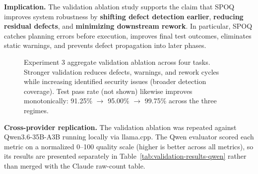 \textbf{Implication.}
The validation ablation study supports the claim that SPOQ improves system robustness by \textbf{shifting defect detection earlier}, \textbf{reducing residual defects}, and \textbf{minimizing downstream rework}. In particular, SPOQ catches planning errors before execution, improves final test outcomes, eliminates static warnings, and prevents defect propagation into later phases.

\begin{figure}[t]
\centering
{}
\caption{Experiment 3 aggregate validation ablation across four tasks. Stronger validation reduces defects, warnings, and rework cycles while increasing identified security issues (broader detection coverage). Test pass rate (not shown) likewise improves monotonically: 91.25\% $\to$ 95.00\% $\to$ 99.75\% across the three regimes.}
\label{fig:validation-ablation}
\end{figure}

\textbf{Cross-provider replication.}
The validation ablation was repeated against Qwen3.6-35B-A3B running locally via llama.cpp. The Qwen evaluator scored each metric on a normalized 0--100 quality scale (higher is better across all metrics), so its results are presented separately in Table~\ref{tab:validation-results-qwen} rather than merged with the Claude raw-count table.

